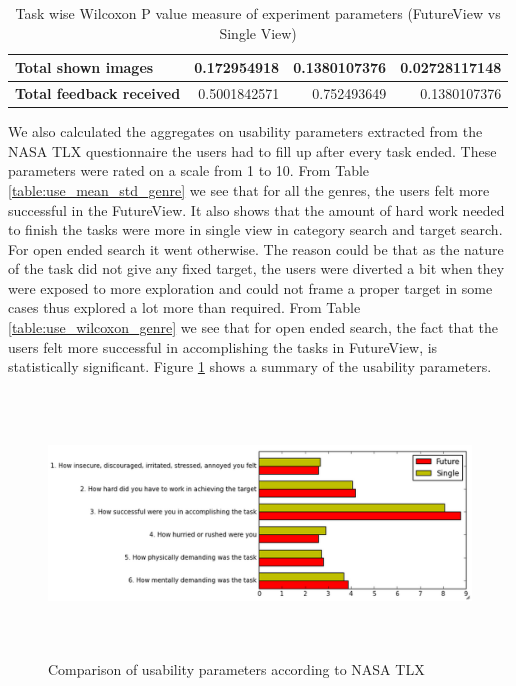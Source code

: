 \documentclass[english]{tktltiki}
\begin{document}
\begin{table}
\begin{center}
\begin{tabular}{|l|r|r|r|}
        \multicolumn{1}{|l|}{\textbf{Total shown images}} & 0.172954918 & 0.1380107376 & 0.02728117148 \\
        \hline
        
        \multicolumn{1}{|l|}{\textbf{Total feedback received}} & 0.5001842571 & 0.752493649 & 0.1380107376 \\
        \hline
        
    \end{tabular}
	\end{center}
	\caption{Task wise Wilcoxon P value measure of experiment parameters (FutureView vs Single View)}
    \label{table:exp_wilcox_task}
\end{table}

We also calculated the aggregates on usability parameters extracted from the NASA  TLX questionnaire the users had to fill up after every task ended. These parameters were rated on a scale from 1 to 10. From Table \ref{table:use_mean_std_genre} we see that for all the genres, the users felt more successful in the FutureView. It also shows that the amount of hard work needed to finish the tasks were more in single view in category search and target search. For open ended search it went otherwise. The reason could be that as the nature of the task did not give any fixed target, the users were diverted a bit when they were exposed to more exploration and could not frame a proper target in some cases thus explored a lot more than required. From Table \ref{table:use_wilcoxon_genre} we see that for open ended search, the fact that the users felt more successful in accomplishing the tasks in FutureView, is statistically significant. Figure \ref{fig:bar_chart_NASA_TLX} shows a summary of the usability parameters.


\begin{figure}[h!]
  \centering
    \includegraphics[width=1.0\textwidth,height=7cm]{figures/Bar_chart_usability_parameters_numbered.png}
    \caption{Comparison of usability parameters according to NASA TLX}
    \label{fig:bar_chart_NASA_TLX}
\end{figure}
\end{document}
